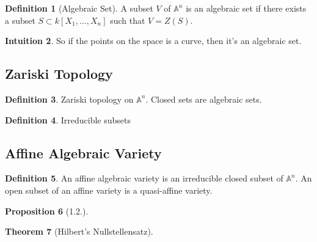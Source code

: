 \documentclass[11pt]{book}
\newtheorem{theorem}{Theorem}[section]
\newtheorem{proposition}[theorem]{Proposition}
\theoremstyle{definition}
\newtheorem{definition}[theorem]{Definition}
\newtheorem{intuition}[theorem]{Intuition}
\numberwithin{equation}{section}
\begin{document}
\begin{defbox}
    \begin{definition}[Algebraic Set]
        \label{def:algebraic_set}
        A subset \(V\) of \(\mathbb{A}^n\) is an algebraic set if there exists a subset \(S \subset k[X_1, \ldots, X_n]\) such that \(V = Z(S)\).
    \end{definition}
\end{defbox}
\begin{intbox}
    \begin{intuition}
        So if the points on the space is a curve, then it's an algebraic set.
    \end{intuition}
\end{intbox}
\newpage
\subsection*{Zariski Topology}
\begin{defbox}
    \begin{definition}
        Zariski topology on \(\mathbb{A}^n\). Closed sets are algebraic sets.
    \end{definition}
\end{defbox}
\begin{defbox}
    \begin{definition}
        Irreducible subsets
    \end{definition}
\end{defbox}
\newpage
\subsection*{Affine Algebraic Variety}

\begin{defbox}
    \begin{definition}
        \label{def:algebraic_variety}
        An affine algebraic variety is an irreducible closed subset of \(\mathbb{A}^n\). An open subset of an affine variety is a quasi-affine variety.
    \end{definition}
\end{defbox}
\begin{thmbox}
    \begin{proposition}[1.2.]
        
    \end{proposition}
\end{thmbox}
\begin{thmbox}
    \begin{theorem}[Hilbert's Nullstellensatz]
        
    \end{theorem}
\end{thmbox}
\end{document}
